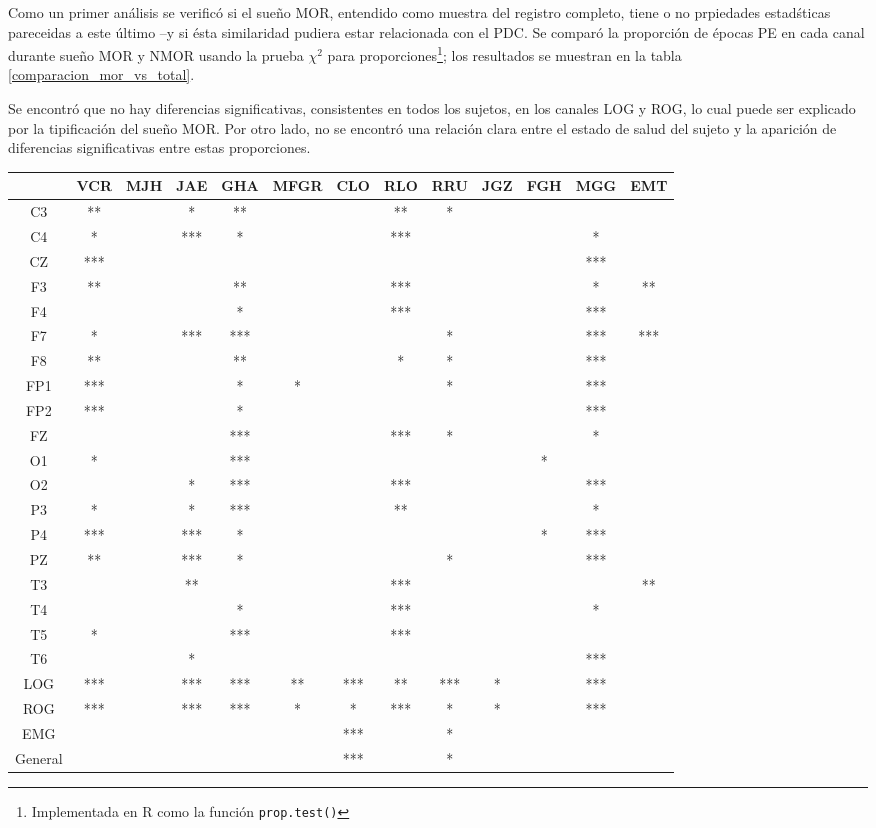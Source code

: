 \documentclass[12pt,a4paper]{mitthesis}
\begin{document}
Como un primer an\'alisis se verific\'o si el sue\~no MOR, entendido como muestra del registro
completo, tiene o no prpiedades estad\'sticas pareceidas a este \'ultimo --y si \'esta similaridad 
pudiera estar relacionada con el PDC. 
Se compar\'o la proporci\'on de \'epocas PE en cada canal durante sue\~no MOR y NMOR usando la 
prueba $\chi^{2}$ para proporciones\footnote{Implementada en R como la funci\'on 
\texttt{prop.test()}}; los resultados se muestran en la tabla \ref{comparacion_mor_vs_total}.

Se encontr\'o que no hay diferencias significativas, consistentes en todos los sujetos, en los 
canales LOG y ROG, lo cual puede ser explicado por la tipificaci\'on del sue\~no MOR. 
Por otro lado, no se encontr\'o una relaci\'on clara entre el estado de salud del sujeto y la 
aparici\'on de diferencias significativas entre estas proporciones.

\begin{SidewaysFigure}
\centering
\begin{tabular}{c||ccccc||cccc||ccc}
&VCR&MJH&JAE&GHA&MFGR&CLO&RLO&RRU&JGZ&FGH&MGG&EMT \\
\hline
C3&**& &*&**& & &**&*& & & &  \\
C4&*& &***&*& & &***& & & &*&  \\
CZ&***& & & & & & & & & &***&  \\
F3&**& & &**& & &***& & & &*&** \\
F4& & & &*& & &***& & & &***&  \\
F7&*& &***&***& & & &*& & &***&*** \\
F8&**& & &**& & &*&*& & &***&  \\
FP1&***& & &*&*& & &*& & &***&  \\
FP2&***& & &*& & & & & & &***&  \\
FZ& & & &***& & &***&*& & &*&  \\
O1&*& & &***& & & & & &*& &  \\
O2& & &*&***& & &***& & & &***& \\ 
P3&*& &*&***& & &**& & & &*&  \\
P4&***& &***&*& & & & & &*&***&  \\
PZ&**& &***&*& & & &*& & &***&  \\
T3& & &**& & & &***& & & & &** \\
T4& & & &*& & &***& & & &*&  \\
T5&*& & &***& & &***& & & & &  \\
T6& & &*& & & & & & & &***&  \\
LOG&***& &***&***&**&***&**&***&*& &***&  \\
ROG&***& &***&***&*&*&***&*&*& &***&  \\
EMG& & & & & &***& &*& & & &  \\
\hline
General& & & & & &***& &*& & & & 
\end{tabular}
\caption{Diferencias significativas para la comparaci\'on entre la proporci\'on de \'epocas PE en 
sue\~no MOR (fase R) y NMOR (fases W y N).
Los asteriscos representan el pvalor con el cual se rechaza la hip\'otesis de que las diferencias 
son significativas: *=0.05 , **=0.01 , ***=0.005}
\label{comparacion_mor_vs_total}
\end{SidewaysFigure}
\end{document}
